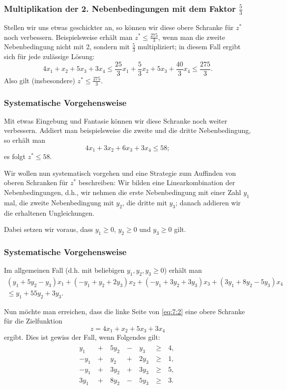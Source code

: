 \documentclass[smaller]{beamer}
\begin{document}
\begin{frame}
\frametitle{Multiplikation der 2. Nebenbedingungen mit dem Faktor $\frac{5}{3}$}
 Stellen wir uns etwas geschickter an, so können wir diese obere Schranke für $z^*$ noch verbessern. Beispielsweise erhält man $z^* \leq \frac{275}{3}$, wenn man die zweite Nebenbedingung nicht mit 2, sondern mit $\frac{5}{3}$ multipliziert; in diesem Fall ergibt sich für jede zulässige Lösung:
\[
4x_1 + x_2 + 5x_3 + 3x_4 \leq \frac{25}{3}x_1 + \frac{5}{3}x_2 + 5x_3 + \frac{40}{3}x_4 \leq \frac{275}{3}.
\]
Also gilt (insbesondere) \alert{$z^* \leq \frac{275}{3}$}.
\end{frame}

\begin{frame}
\frametitle{Systematische Vorgehensweise}
 Mit etwas Eingebung und Fantasie können wir diese Schranke noch weiter verbessern. Addiert man beispielsweise die zweite und die dritte Nebenbedingung, so erhält man
\[
4x_1 + 3x_2 + 6x_3 + 3x_4 \leq 58;
\]
es folgt \alert{$z^* \leq 58$}. \\ \vspace*{0.2cm}

Wir wollen nun systematisch vorgehen und eine Strategie zum Auffinden von oberen Schranken für $z^*$ beschreiben: \alert{Wir bilden eine Linearkombination der Nebenbedingungen}, d.h., wir nehmen die erste Nebenbedingung mit einer Zahl $y_1$ mal, die zweite Nebenbedingung mit $y_2$, die dritte mit $y_3$; danach addieren wir die erhaltenen Ungleichungen. \\ \vspace*{0.2cm}

\alert{Dabei setzen wir voraus, dass $y_1 \geq 0$, $y_2 \geq 0$ und $y_3 \geq 0$ gilt}.
\end{frame}

\begin{frame}
\frametitle{Systematische Vorgehensweise}
 Im allgemeinen Fall (d.h. mit beliebigen $y_1,y_2,y_3 \geq 0$) erhält man
\begin{multline}
\label{eq:7:2}
( y_1+5y_2-y_3)x_1 + (-y_1+y_2+2y_3)x_2 + ( -y_1+3y_2+3y_3 )x_3 + ( 3y_1+8y_2-5y_3)x_4
 \\ \leq y_1 + 55y_2 + 3y_3.
\end{multline}

Nun möchte man erreichen, dass die linke Seite von \eqref{eq:7:2} eine obere Schranke für die Zielfunktion 
\[
z = 4x_1+x_2+5x_3+3x_4
\]
ergibt. Dies ist gewiss der Fall, wenn Folgendes gilt:
\begin{align*}
\begin{alignedat}{4}
 y_1 &\ + &\ 5y_2 &\ - &\  y_3 &\ \geq &\ 4,\ \\
-y_1 &\ + &\  y_2 &\ + &\ 2y_3 &\ \geq &\ 1,\ \\
-y_1 &\ + &\ 3y_2 &\ + &\ 3y_3 &\ \geq &\ 5,\ \\
3y_1 &\ + &\ 8y_2 &\ - &\ 5y_3 &\ \geq &\ 3.\
\end{alignedat}
\end{align*}
\end{frame}
\end{document}
